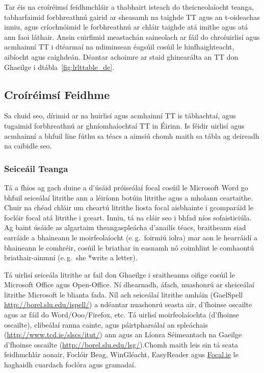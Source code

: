 \begin{multicols}{2}
Tar éis na croíréimsí feidhmchláir a thabhairt isteach do theicneolaíocht teanga, tabharfaimid forbhreathnú gairid ar sheasamh na taighde TT agus an t-oideachas inniu, agus críochnóimid le forbhreathnú ar chláir taighde atá imithe agus atá ann faoi láthair. Ansin cuirfimid meastachán saineolach ar fáil do chroíuirlisí agus acmhainní TT i dtéarmaí na ndiminsean éagsúil cosúil le hinfhaighteacht, aibíocht agus caighdeán. Déantar achoimre ar staid ghinearálta an TT don Ghaeilge i dtábla~\ref{fig:lrlttable_de}.

\subsection{Croíréimsí Feidhme} 

Sa chuid seo, dírimid ar na huirlisí agus acmhainní TT is tábhachtaí, agus tugaimid forbhreathnú ar ghníomhaíochtaí TT in Éirinn. Is féidir uirlisí agus acmhainní a bhfuil líne fúthu sa téacs a aimsiú chomh maith sa tábla ag deireadh na caibidle seo. 

\subsubsection{Seiceáil Teanga}

Tá a fhios ag gach duine a d’úsáid próiseálaí focal cosúil le Microsoft Word go bhfuil seiceálaí litrithe ann a léiríonn botúin litrithe agus a mholann ceartaithe. Chuir na chéad chláir um cheartú litrithe liosta focal aisbhainte i gcomparáid le foclóir focal atá litrithe i gceart. Inniu, tá na cláir seo i bhfad níos sofaisticiúla. Ag baint úsáide as algartaim theangaspleácha d’anailís téacs, braitheann siad earráide a bhaineann le moirfeolaíocht (e.\,g.~foirmiú iolra) mar aon le hearráidí a bhaineann le comhréir, cosúil le briathar in easnamh nó coimhlint le comhaontú briathair-ainmní (e.\,g.~she *write a letter). 

Tá uirlisí seiceála litrithe ar fail don Ghaeilge i sraitheanna oifige cosúil le Microsoft Office agus Open-Office. Ní dhearnadh, áfach, nuashonrú ar sheiceálaí litrithe Microsoft le blianta fada. Níl ach seiceálaí litrithe amháin (GaelSpell \url{http://borel.slu.edu/ispell/}) a ndéantar nuashonrú seasta air, d’fhoinse oscailte agus ar fáil do Word/Ooo/Firefox, etc. Tá uirlisí moirfeolaíochta (d’fhoinse oscailte), clibeálaí ranna cainte, agus páirtpharsálaí an spleáchais (\url{http://www.tcd.ie/slscs/itut/}) ann  agus an Líonra Séimeantach na Gaeilge d’fhoinse oscailte (\url{http://borel.slu.edu/lsg/}).Chomh maith leis sin tá scata feidhmchlár aonair, Foclóir Beag, WinGléacht, EasyReader agus \url{Focal.ie} le haghaidh cuardach foclóra agus gramadaí.


\end{multicols}
